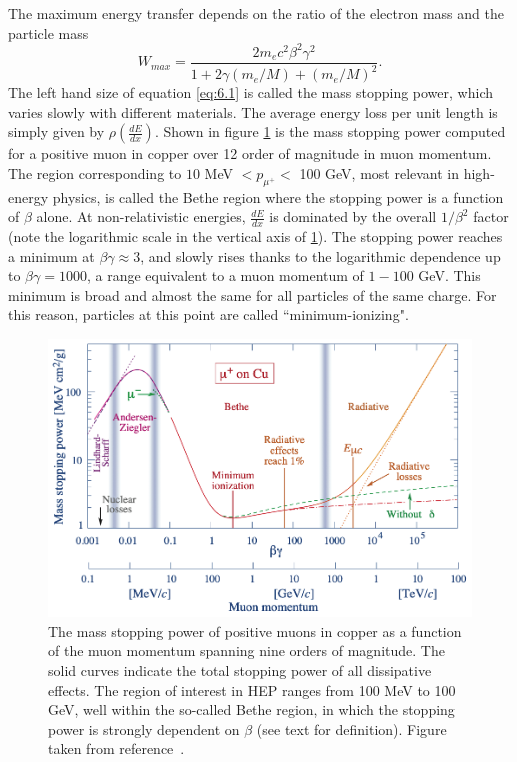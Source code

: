 The maximum energy transfer depends on the ratio of the electron mass and the particle mass
\begin{equation}
    \label{eq:6.2}
    W_{max} = \frac{2m_ec^2\beta^2\gamma^2}{1+2\gamma (m_e/M) + (m_e/M)^2}.
\end{equation}
The left hand size of equation \eqref{eq:6.1} is called the mass stopping power, which varies slowly with different materials. The average energy loss per unit length is simply given by $\rho \left(  \frac{dE}{dx}\right)$. Shown in figure \ref{fig:bethe-bloch} is the mass stopping power computed for a positive muon in copper over 12 order of magnitude in muon momentum. The region corresponding to $10$ MeV $<p_{\mu ^+}< $ 100 GeV, most relevant in high-energy physics, is called the Bethe region where the stopping power is a function of $\beta$ alone. At non-relativistic energies, $\frac{dE}{dx}$ is dominated by the overall $1/\beta^2$ factor (note the logarithmic scale in the vertical axis of \ref{fig:bethe-bloch}). The stopping power reaches a minimum at $\beta\gamma\approx 3$, and slowly rises thanks to the logarithmic dependence up to $\beta\gamma = 1000$, a range equivalent to a muon momentum of $1-100$ GeV. This minimum is broad and almost the same for all particles of the same charge. For this reason, particles at this point are called ``minimum-ionizing".  
\begin{figure}[h!]
    \centering
    \includegraphics[width=0.9\linewidth]{figures/bethe-bloch.png}
    \caption{The mass stopping power of positive muons in copper as a function of the muon momentum spanning nine orders of magnitude. The solid curves indicate the total stopping power of all dissipative effects. The region of interest in HEP ranges from 100 MeV to 100 GeV, well within the so-called Bethe region, in which the stopping power is strongly dependent on $\beta$ (see text for definition). Figure taken from reference~\cite{Zyla:2020zbs}.}
    \label{fig:bethe-bloch}
\end{figure}


